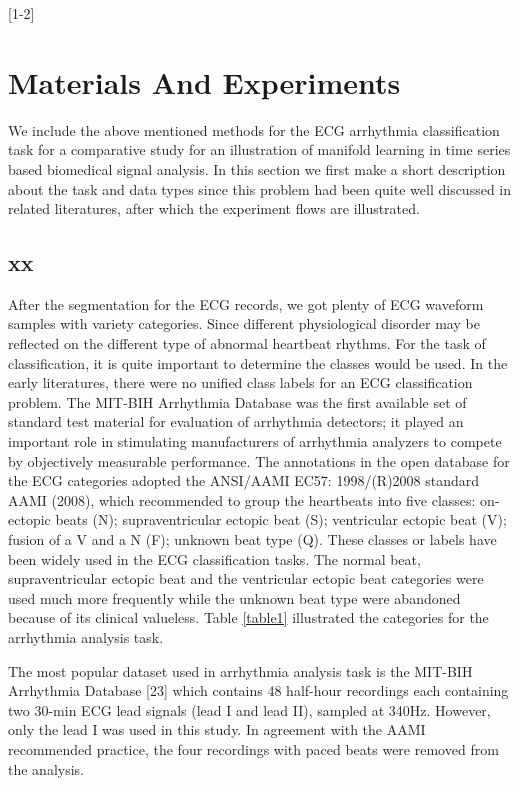 \documentclass[journal]{IEEEtran}
\begin{document}
[1-2]


\section{Materials And Experiments}
We include the above mentioned methods for the ECG arrhythmia classification task for a comparative study for an illustration of manifold learning in time series based biomedical signal analysis.
In this section we first make a short description about the task and data types since this problem had been quite well discussed in related literatures, after which the experiment flows are illustrated.

\subsection{xx}

%
%

After the segmentation for the ECG records, we got plenty of ECG waveform samples with variety categories. 
Since different physiological disorder may be reflected on the different type of abnormal heartbeat rhythms. 
For the task of classification, it is quite important to determine the classes would be used. 
In the early literatures, there were no unified class labels for an ECG classification problem. 
The MIT-BIH Arrhythmia Database was the first available set of standard test material for evaluation of arrhythmia detectors; it played an important role in stimulating manufacturers of arrhythmia analyzers to compete by objectively measurable performance. 
The annotations in the open database for the ECG categories adopted the ANSI/AAMI EC57: 1998/(R)2008 standard AAMI (2008), which recommended to group the heartbeats into five classes: on-ectopic beats (N); supraventricular ectopic beat (S); ventricular ectopic beat (V); fusion of a V and a N (F); unknown beat type (Q). These classes or labels have been widely used in the ECG classification tasks. 
The normal beat, supraventricular ectopic beat and the ventricular ectopic beat categories were used much more frequently while the unknown beat type were abandoned because of its clinical valueless.
Table \ref{table1} illustrated the categories for the arrhythmia analysis task.

The most popular dataset used in arrhythmia analysis task is the MIT-BIH Arrhythmia Database [23] which contains 48 half-hour recordings each containing two 30-min ECG lead signals (lead I and lead II), sampled at 340Hz. 
However, only the lead I was used in this study. 
In agreement with the AAMI recommended practice, the four recordings with paced beats were removed from the analysis. 
\end{document}
